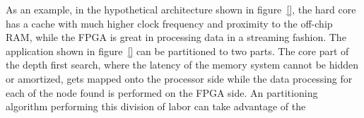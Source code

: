 As an example, in the hypothetical architecture shown in figure~\ref{}, the hard core has a cache with much higher clock frequency and proximity to the off-chip RAM, while the FPGA is great in processing data in a streaming fashion. The application shown in figure~\ref{} can be partitioned to two parts. The core part of the depth first search, where the latency of the memory system cannot be hidden or amortized, gets mapped onto the processor side while the data processing for each of the node found is performed on the FPGA side. An partitioning algorithm performing this division of labor can take advantage of the  



























